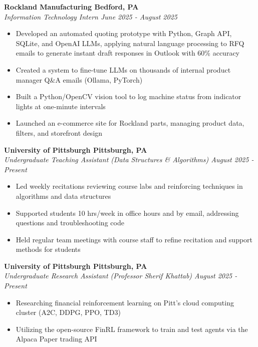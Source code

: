 \documentclass[11pt]{article}
\begin{document}
\begin{adjustwidth}{0.5em}{0em}
\textbf{Rockland Manufacturing \hfill Bedford, PA} \\
\textit{Information Technology Intern \hfill June 2025 - August 2025} 
\begin{itemize}[leftmargin=1.5em, itemsep=0em, topsep=0.2em]
    \item Developed an automated quoting prototype with Python, Graph API, SQLite, and OpenAI LLMs, applying natural language processing to RFQ emails to generate instant draft responses in Outlook with 60\% accuracy
    \item Created a system to fine-tune LLMs on thousands of internal product manager Q\&A emails (Ollama, PyTorch)
    \item Built a Python/OpenCV vision tool to log machine status from indicator lights at one-minute intervals
    \item Launched an e-commerce site for Rockland parts, managing product data, filters, and storefront design
\end{itemize} 
\end{adjustwidth}

\vspace{0.1em}

\begin{adjustwidth}{0.5em}{0em}
\textbf{University of Pittsburgh \hfill Pittsburgh, PA} \\
\textit{Undergraduate Teaching Assistant (Data Structures \& Algorithms) \hfill August 2025 - Present}
\begin{itemize}[leftmargin=1.5em, itemsep=0em, topsep=0.2em]
    \item Led weekly recitations reviewing course labs and reinforcing techniques in algorithms and data structures
    \item Supported students 10 hrs/week in office hours and by email, addressing questions and troubleshooting code
    \item Held regular team meetings with course staff to refine recitation and support methods for students
\end{itemize}    
\end{adjustwidth}

\vspace{0.1em}


\begin{adjustwidth}{0.5em}{0em}
\textbf{University of Pittsburgh \hfill Pittsburgh, PA} \\
\textit{Undergraduate Research Assistant (Professor Sherif Khattab) \hfill August 2025 - Present}
\begin{itemize}[leftmargin=1.5em, itemsep=0em, topsep=0.2em]
    \item Researching financial reinforcement learning on Pitt’s cloud computing cluster (A2C, DDPG, PPO, TD3)
    \item Utilizing the open-source FinRL framework to train and test agents via the Alpaca Paper trading API
\end{itemize}    
\end{adjustwidth}
\end{document}
